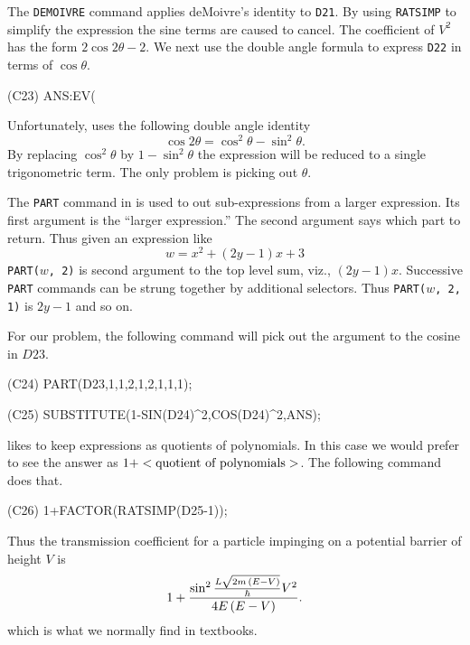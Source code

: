 The {\tt DEMOIVRE} command applies deMoivre's identity to {\tt D21}.  By
using {\tt RATSIMP} to simplify the expression the sine terms are caused to
cancel.  The coefficient of $V^2$ has the form $2 \cos 2 \theta - 2$.  We
next use the double angle formula to express {\tt D22} in terms of $\cos
\theta$.

\begin{code}
(C23) ANS:EV(%
\end{code}
Unfortunately, {\Macsyma} uses the following double angle identity
\[
\cos 2\theta = \cos^2 \theta - \sin^2 \theta.
\]
By replacing $\cos^2 \theta$ by $1 - \sin^2 \theta$ the expression will be
reduced to a single trigonometric term.  The only problem is picking out
$\theta$.  

The {\tt PART} command in {\Macsyma} is used to out sub-expressions from
a larger expression.  Its first argument is the ``larger expression.''
The second argument says which part to return.  Thus given an
expression like
\[
w = x^2 + (2y - 1) x + 3
\]
{\tt PART($w$, 2)} is second argument to the top level sum, viz.,
$(2y-1) x$.  Successive {\tt PART} commands can be strung together by
additional selectors.  Thus {\tt PART($w$, 2, 1)} is $2y-1$ and so on.

For our problem, the following command will pick out the argument to the
cosine in $D23$.

\begin{code}
(C24) PART(D23,1,1,2,1,2,1,1,1);
\end{code} 
\begin{code}
(C25) SUBSTITUTE(1-SIN(D24)^2,COS(D24)^2,ANS);
\end{code}
{\Macsyma} likes to keep expressions as quotients of polynomials.  In this case
we would prefer to see the answer as $1 + <\hbox{quotient of polynomials}>$.
The following command does that. 
\begin{code}
(C26) 1+FACTOR(RATSIMP(D25-1));
\end{code}
Thus the transmission coefficient for a particle impinging on a potential
barrier of height $V$ is
\[
1 + {\sin^2 {L \sqrt{2 m\,(E - V)} \over \hbar} V^2 \over 4 E \, (E - V)}.
\]
which is what we normally find in textbooks.

